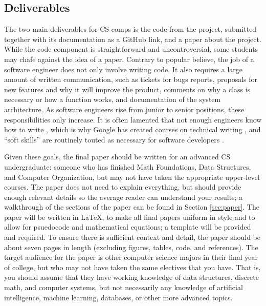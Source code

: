 \documentclass[10pt,twocolumn]{article}
\begin{document}
\subsection{Deliverables}

The two main deliverables for CS comps is the code from the project, submitted together with its documentation as a GitHub link, and a paper about the project.
While the code component is straightforward and uncontroversial, some students may chafe against the idea of a paper.
Contrary to popular believe, the job of a software engineer does not only involve writing code.
It also requires a large amount of written communication, such as tickets for bugs reports, proposals for new features and why it will improve the product, comments on why a class is necessary or how a function works, and documentation of the system architecture.
As software engineers rise from junior to senior positions, these responsibilities only increase.
It is often lamented that not enough engineers know how to write \cite{Mei2018WhyDevelopersShould,Alton2020WhyEveryDeveloper}, which is why Google has created courses on technical writing \cite{GoogleTechnicalWriting}, and ``soft skills'' are routinely touted as necessary for software developers \cite{Indeed202111ImportantSoft}.

Given these goals, the final paper should be written for an advanced CS undergraduate: someone who has finished Math Foundations, Data Structures, and Computer Organization, but may not have taken the appropriate upper-level courses.
The paper does not need to explain everything, but should provide enough relevant details so the average reader can understand your results; a walkthrough of the sections of the paper can be found in Section \ref{sec:paper}.
The paper will be written in LaTeX, to make all final papers uniform in style and to allow for psuedocode and mathematical equations; a template will be provided and required.
To ensure there is sufficient context and detail, the paper should be about seven pages in length (excluding figures, tables, code, and references).
The target audience for the paper is other computer science majors in their final year of college, but who may not have taken the same electives that you have.
That is, you should assume that they have working knowledge of data structures, discrete math, and computer systems, but not necessarily any knowledge of artificial intelligence, machine learning, databases, or other more advanced topics.
\end{document}

